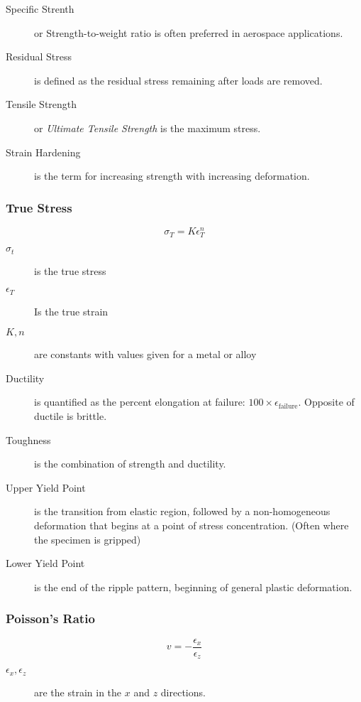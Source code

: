\documentclass[10pt,letterpaper]{article}
\begin{document}
	\begin{description}
		\item[Specific Strenth] or Strength-to-weight ratio is often preferred in aerospace applications.
		\item[Residual Stress] is defined as the residual stress remaining after loads are removed. 
		\item[Tensile Strength] or \textit{Ultimate Tensile Strength} is the maximum stress. 
		\item[Strain Hardening] is the term for increasing strength with increasing deformation. 
	\end{description}
	
	\subsubsection*{True Stress}
	$$
	\sigma_T = K\epsilon^n_T
	$$
	\begin{description}
		\item[$\sigma_t$] is the true stress
		\item[$\epsilon_T$] Is the true strain
		\item[$K,n$] are constants with values given for a metal or alloy
	\end{description}
	
	\begin{description}
		\item[Ductility] is quantified as the percent elongation at failure: $100 \times \epsilon_{\text{failure}}$. Opposite of ductile is brittle. 
		\item[Toughness] is the combination of strength and ductility. 
		\item[Upper Yield Point] is the transition from elastic region, followed by a non-homogeneous deformation that begins at a point of stress concentration. (Often where the specimen is gripped)
		\item[Lower Yield Point] is the end of the ripple pattern, beginning of general plastic deformation. 
	\end{description}
	
	\subsubsection*{Poisson's Ratio}
	$$
	v = - \frac{\epsilon_x}{\epsilon_z}
	$$
	\begin{description}
		\item[$\epsilon_x,\epsilon_z$] are the strain in the $x$ and $z$ directions. 
	\end{description}
	
\end{document}
